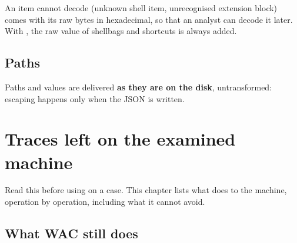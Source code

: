 \documentclass[11pt,a4paper,oneside]{report}
\begin{document}
An item \wac{} cannot decode (unknown shell item, unrecognised extension block)
comes with its raw bytes in hexadecimal, so that an analyst can decode it later.
With , the raw value of shellbags and shortcuts is always added.

\section{Paths}

Paths and values are delivered \textbf{as they are on the disk}, untransformed:
escaping happens only when the JSON is written.

\chapter{Traces left on the examined machine}\label{chap:traces}

Read this before using \wac{} on a case. This chapter lists what \wac{} does to
the machine, operation by operation, including what it cannot avoid.

\section{What WAC still does}
\end{document}
